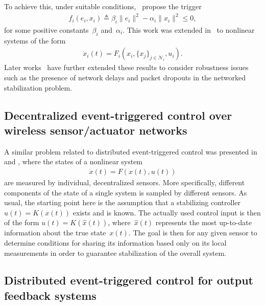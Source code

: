 \documentclass{autart}
\newcommand{\NN}{{\mathcal{N}}}
\newcommand{\TwoNorm}[1]{\|#1\|}
\renewcommand{\hat}{\widehat}
\begin{document}
{  To achieve this, under suitable conditions,~\cite{XW-MDL:08} propose
  the trigger
  \begin{align*}
    f_i(e_i,x_i) \triangleq \beta_i \TwoNorm{e_i}^2 - \alpha_i
    \TwoNorm{x_i}^2 \leq 0 ,
  \end{align*}
  for some positive constants~$\beta_i$ and~$\alpha_i$.  This work was
  extended in~\citep{XW-MDL:11,CDP-RS-FW:13} to nonlinear systems of
  the form
  \begin{align*}
    \dot{x}_i (t)= F_i( x_i, \{x_j\}_{j \in \NN_i}, u_i).
  \end{align*}
  Later works~\citep{MG-DL-JS-SD-KHJ:12,MG-DVD-KHJ-JS-SD:13} have
  further extended these results to consider robustness issues such as
  the presence of network delays and packet dropouts in the networked
  stabilization problem.

  \subsection{Decentralized event-triggered control over wireless
    sensor/actuator networks}
  A similar problem related to distributed event-triggered control was
  presented in~\citep{MMJ-PT:10} and \citep{RP-PT-DN-AA:11}, where the
  states of a nonlinear system
  \begin{align*}%
    \dot{x}(t)=F(x(t),u(t))
  \end{align*}
  are measured by individual, decentralized sensors. More
  specifically, different components of the state of a single system
  is sampled by different sensors. As usual, the starting point here
  is the assumption that a stabilizing controller~$u(t) = K(x(t))$
  exists and is known. The actually used control input is then of the
  form $u(t)=K(\hat{x}(t))$, where~$\hat{x}(t)$ represents the most
  up-to-date information about the true state~$x(t)$. The goal is then
  for any given sensor to determine conditions for sharing its
  information based only on its local measurements in order to
  guarantee stabilization of the overall system.

  \subsection{Distributed event-triggered control for output
    feedback systems}

}
\end{document}

